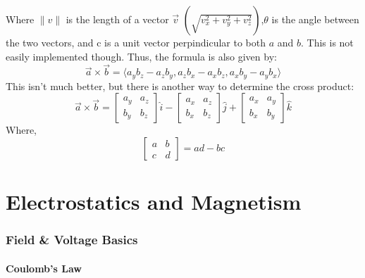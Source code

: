 \documentclass[a4paper,12pt]{article}
\begin{document}
								Where $\|v\|$ is the length of a vector $\vec{v}$  $\left( \sqrt{v_{x}^{2} + v_{y}^{2} + v_{z}^{2}}\right)$,$\theta$ is the angle between the two vectors, and c is a unit vector perpindicular to both $a$ and $b$. This is not easily implemented though. Thus, the formula is also given by:
								\begin{equation*}
										\vec{a} \times \vec{b} = \langle a_{y}b_{z} - a_{z}b_{y}, a_{z}b_{x} - a_{x}b_{z}, a_{x}b_{y}-a_{y}b_{x}\rangle
								\end{equation*}
								This isn't much better, but there is another way to determine the cross product:
								\begin{equation*}
										\vec{a} \times \vec{b} = \begin{bmatrix}
												a_{y} & a_{z} \\
												b_{y} & b_{z} 
										\end{bmatrix}\hat{i} - \begin{bmatrix}
												a_{x} & a_{z} \\
												b_{x}& b_{z} 
										\end{bmatrix}\hat{j} + \begin{bmatrix}
												a_{x} & a_{y} \\
												b_{x}& b_{y} 
										\end{bmatrix}\hat{k} 
								\end{equation*}
								Where,
								\begin{equation*}
										\begin{bmatrix}
												a & b \\
												c & d
										\end{bmatrix} = ad-bc
								\end{equation*}
		\newpage
\setcounter{section}{0}
\setcounter{subsection}{0}
\setcounter{subsubsection}{0}
\part{Electrostatics and Magnetism}
		\section{Field \& Voltage Basics}
				\subsection{Coulomb's Law}
\end{document}
